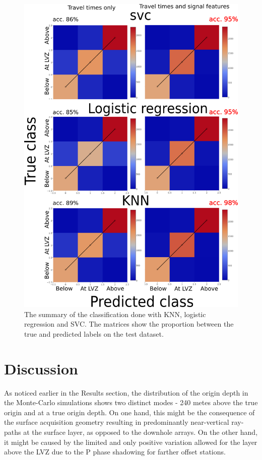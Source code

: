 \begin{figure}[htb]
\begin{center}
\includegraphics[width=0.85\linewidth,angle=0]{./AntonBiryukov_bibtex/Figure_confusion.png}
\end{center}
\vspace{-4mm}
\caption{The summary of the classification done with KNN, logistic regression and SVC. The matrices show the proportion between the true and predicted labels on the test dataset.}
\label{fig:confusion}
\end{figure}

\section{Discussion}
As noticed earlier in the Results section, the distribution of the origin depth in the Monte-Carlo simulations shows two distinct modes - 240 metes above the true origin and at a true origin depth. On one hand, this might be the consequence of the surface acquisition geometry resulting in predominantly near-vertical ray-paths at the surface layer, as opposed to the downhole arrays. On the other hand, it might be caused by the limited and only positive variation allowed for the layer above the LVZ due to the P phase shadowing for farther offset stations.


